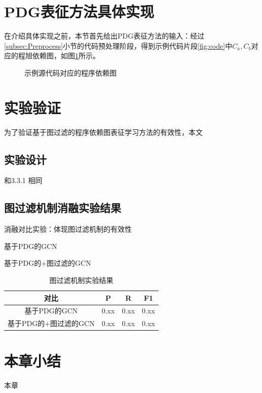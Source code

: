 \section{PDG表征方法具体实现}
\label{sec:achieve}
在介绍具体实现之前，本节首先给出PDG表征方法的输入：经过\ref{subsec:Preprocess}小节的代码预处理阶段，得到示例代码片段\ref{fig:code}中$C_{a},C_{b}$对应的程旭依赖图，如图\ref{fig:pdgcode}所示。
\begin{figure}[htbp]
  \centering  %
  \qquad
  \caption{示例源代码对应的程序依赖图}    %
  \label{fig:pdgcode}    %
\end{figure}


\section{实验验证}
为了验证基于图过滤的程序依赖图表征学习方法的有效性，本文
\subsection{实验设计}
和3.3.1 相同
\subsection{图过滤机制消融实验结果}
消融对比实验：体现图过滤机制的有效性

基于PDG的GCN

基于PDG的+图过滤的GCN


\begin{table}
  \centering
  \caption{图过滤机制实验结果} %
  \begin{tabular*}{0.9\textwidth}{@{\extracolsep{\fill}}cccc}
  \toprule
    对比			&P		&R		&F1 \\
  \midrule
    基于PDG的GCN			&0.xx	&0.xx		&0.xx \\
    基于PDG的+图过滤的GCN			&0.xx		&0.xx		&0.xx \\
  \bottomrule
  \end{tabular*}
\end{table}

\section{本章小结}
本章



